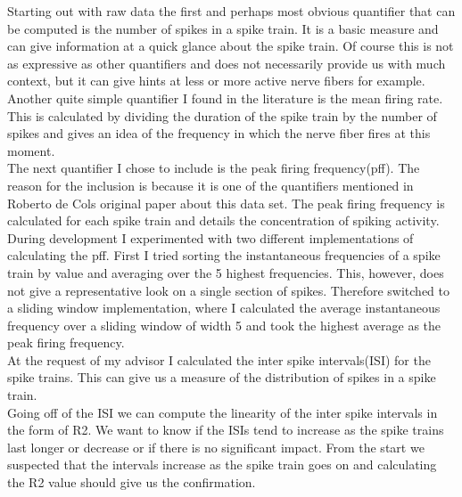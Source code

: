 Starting out with raw data the first and perhaps most obvious quantifier that can be computed is the number of spikes in a spike train. It is a basic measure and can give information at a quick glance about the spike train. Of course this is not as expressive as other quantifiers and does not necessarily provide us with much context, but it can give hints at less or more active nerve fibers for example. \\
Another quite simple quantifier I found in the literature is the mean firing rate. This is calculated by dividing the duration of the spike train by the number of spikes and gives an idea of the frequency in which the nerve fiber fires at this moment.\\
The next quantifier I chose to include is the peak firing frequency(pff). The reason for the inclusion is because it is one of the quantifiers mentioned in Roberto de Cols original paper about this data set. The peak firing frequency is calculated for each spike train and details the concentration of spiking activity. During development I experimented with two different implementations of calculating the pff. First I tried sorting the instantaneous frequencies of a spike train by value and averaging over the 5 highest frequencies. This, however, does not give a representative look on a single section of spikes. Therefore switched to a sliding window implementation, where I calculated the average instantaneous frequency over a sliding window of width 5 and took the highest average as the peak firing frequency.\\
At the request of my advisor I calculated the inter spike intervals(ISI) for the spike trains. This can give us a measure of the distribution of spikes in a spike train.\\
Going off of the ISI we can compute the linearity of the inter spike intervals in the form of R2. We want to know if the ISIs tend to increase as the spike trains last longer or decrease or if there is no significant impact. From the start we suspected that the intervals increase as the spike train goes on and calculating the R2 value should give us the confirmation.



\cleardoublepage
